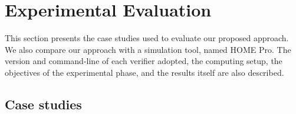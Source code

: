 \documentclass[review]{elsarticle}
\begin{document}
\section{Experimental Evaluation}
\label{sec:Results}

This section presents the case studies used to evaluate our proposed approach. 
We also compare our approach with a simulation tool, named HOME Pro. 
The version and command-line of each verifier adopted, 
the computing setup, the objectives of the experimental phase, 
and the results itself are also described.

\subsection{Case studies} 
\end{document}
